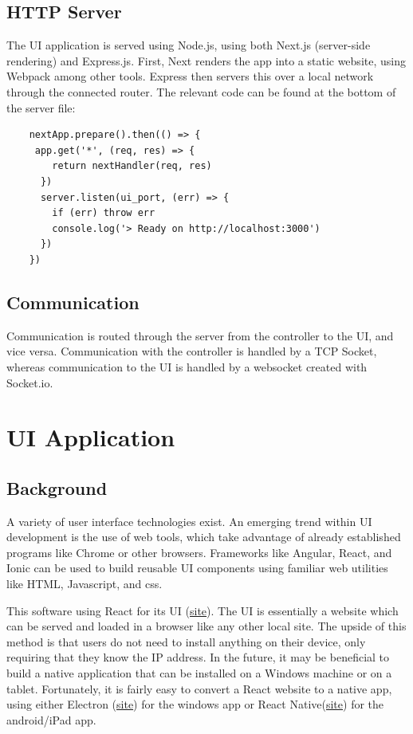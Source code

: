 \documentclass{article}
\begin{document}
	\subsection{HTTP Server}

	The UI application is served using Node.js, using both Next.js (server-side rendering) and Express.js. First, Next renders the app into a static website, using Webpack among other tools. Express then servers this over a local network through the connected router. The relevant code can be found at the bottom of the server file: 
	
	\begin{verbatim}
	nextApp.prepare().then(() => {
 	 app.get('*', (req, res) => {
	    return nextHandler(req, res)
	  })
	  server.listen(ui_port, (err) => {
	    if (err) throw err
	    console.log('> Ready on http://localhost:3000')
	  })
	})
	\end{verbatim}
		
	
	\subsection{Communication}
	
	Communication is routed through the server from the controller to the UI, and vice versa. Communication with the controller is handled by a TCP Socket, whereas communication to the UI is handled by a websocket created with Socket.io. 
	
\section{UI Application}
	\subsection{Background}
	
	A variety of user interface technologies exist. An emerging trend within UI development is the use of web tools, which take advantage of already established programs like Chrome or other browsers. Frameworks like Angular, React, and Ionic can be used to build reusable UI components using familiar web utilities like HTML, Javascript, and css. 
	
	This software using React for its UI (\href{https://reactjs.org/}{site}). The UI is essentially a website which can be served and loaded in a browser like any other local site. The upside of this method is that users do not need to install anything on their device, only requiring that they know the IP address. In the future, it may be beneficial to build a native application that can be installed on a Windows machine or on a tablet. Fortunately, it is fairly easy to convert a React website to a native app, using either Electron (\href{https://electronjs.org/}{site}) for the windows app or React Native(\href{https://facebook.github.io/react-native/}{site}) for the android/iPad app. 
	
\end{document}
